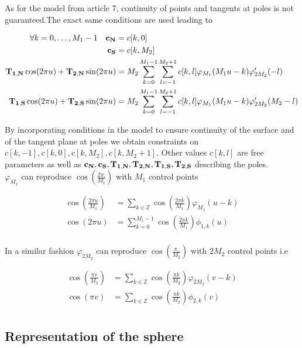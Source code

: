 \documentclass[a4paper, 11pt]{article}
\begin{document}
As for the model from article 7, continuity of points and tangents at poles is not guaranteed.The exact same conditions 
are used leading to

\begin{align}
  \forall k=0, \ldots, M_1-1 \quad {\bf c_N} &= c[k,0] \\
  {\bf c_S} &= c[k, M_2] \\
  {\bf T_{1,N}}\cos (2\pi u) + {\bf T_{2,N}}\sin (2\pi u) &= M_2 \sum_{k=0}^{M_1-1} \sum_{l=-1}^{M_2+1} c[k,l] 
  \varphi_{M_1} (M_1u-k)\varphi_{2M_2}'(-l) \\
  {\bf T_{1,S}}\cos (2\pi u) + {\bf T_{2,S}}\sin (2\pi u) &= M_2 \sum_{k=0}^{M_1-1} \sum_{l=-1}^{M_2+1} c[k,l] 
  \varphi_{M_1} (M_1u-k)\varphi_{2M_2}'(M_2-l)\\
\end{align}


By incorporating conditions in the model to ensure continuity of the surface and of the tangent plane at poles we obtain 
constraints on $c[k, -1], c[k,0], c[k,M_2], c[k, M_2+1]$. Other values $c[k,l]$ are free parameters as well as
${\bf c_N, c_S, T_{1, N}, T_{2, N}, T_{1, S}, T_{2, S}}$ describing the poles. \\

$\varphi_{M_1}$ can reproduce $\cos (\frac{2\pi.}{M_1})$ with $M_1$ control points

\begin{align*}
  \cos (\frac{2\pi u}{M_1}) &= \sum_{k \in \mathbb{Z}} \cos (\frac{2 \pi k}{M_1}) \varphi_{M_1}(u-k) \\
  \cos (2\pi u) &= \sum_{k=0}^{M_1-1} \cos (\frac{2 \pi k}{M_1}) \phi_{1, k}(u) \\
\end{align*}

In a similar fashion $\varphi_{2M_2}$ can reproduce $\cos (\frac{\pi.}{M_2})$ with $2M_2$ control points i.e

\begin{align*}
  \cos (\frac{\pi v}{M_2}) &= \sum_{k \in \mathbb{Z}} \cos (\frac{\pi k}{M_2}) \varphi_{2M_2}(v-k) \\
  \cos (\pi v) &= \sum_{k \in \mathbb{Z}} \cos (\frac{\pi k}{M_2}) \phi_{2, k}(v) \\
\end{align*}

\subsection{Representation of the sphere}
\end{document}

